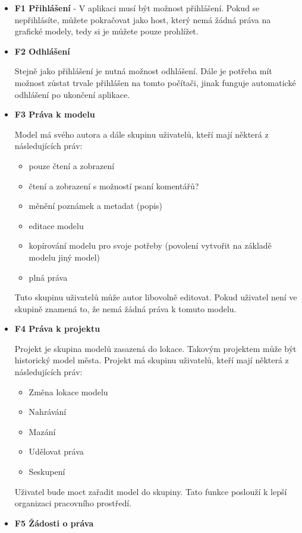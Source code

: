 \documentclass[thesis=B,czech]{FITthesis}[2012/06/26]
\begin{document}
            \begin{itemize}
                \item \textbf{F1 Přihlášení} - V aplikaci musí být možnost přihlášení. Pokud se nepřihlásíte, můžete pokračovat jako host, který nemá žádná práva na grafické modely, tedy si je můžete pouze prohlížet.
                \item \textbf{F2 Odhlášení}
                
                Stejně jako přihlášení je nutná možnost odhlášení. Dále je potřeba mít možnost zůstat trvale přihlášen na tomto počítači, jinak funguje automatické odhlášení po ukončení aplikace.
               \item \textbf{F3 Práva k modelu}
               
                Model má svého autora a dále skupinu uživatelů, kteří mají některá z následujících práv:
                \begin{itemize}
                    \item pouze čtení a zobrazení
                    \item čtení a zobrazení s možností psaní komentářů?
                    \item měnění poznámek a metadat (popis)
                    \item editace modelu
                    \item kopírování modelu pro svoje potřeby (povolení vytvořit na základě modelu jiný model)
                    \item plná práva
                \end{itemize}
                Tuto skupinu uživatelů může autor libovolně editovat. Pokud uživatel není ve skupině znamená to, že nemá žádná práva k tomuto modelu.
               \item \textbf{F4 Práva k projektu}
               
                Projekt je skupina modelů zasazená do lokace. Takovým projektem může být historický model města. Projekt má skupinu uživatelů, kteří mají některá z následujících práv:
                \begin{itemize}
                    \item Změna lokace modelu
                    \item Nahrávání
                    \item Mazání
                    \item Udělovat práva
                    \item Seskupení
                \end{itemize}
                Uživatel bude moct zařadit model do skupiny. Tato funkce poslouží k lepší organizaci pracovního prostředí.
                \item \textbf{F5 Žádosti o práva}
                

\end{itemize}
\end{document}

